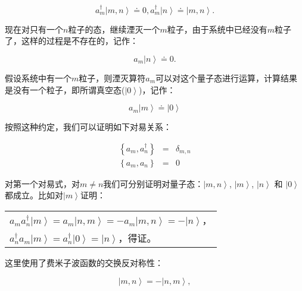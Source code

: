 \begin{equation*}
a_m^\dag  \left| {m,n} \right\rangle  \doteq 0, a_m^\dag  \left| n
\right\rangle \doteq \left| {m,n} \right\rangle .
\end{equation*}


现在对只有一个$n$粒子的态，继续湮灭一个$m$粒子，由于系统中已经没有$m$粒子了，这样的过程是不存在的，记作：

\begin{equation*}
a_m \left| n \right\rangle \doteq 0 .
\end{equation*}


假设系统中有一个$m$粒子，则湮灭算符$a_m$可以对这个量子态进行运算，计算结果是没有一个粒子，即所谓真空态($\left|
0 \right\rangle$)，记作：

\begin{equation}\label{eq 3}
a_m \left| m \right\rangle \doteq \left| 0 \right\rangle
\end{equation}


按照这种约定，我们可以证明如下对易关系：

\begin{eqnarray}
  \left\{ {a_m ,a_n^\dag  } \right\} &=& \delta _{m,n} \\
  \left\{
{a_m,a_n } \right\} &=& 0
\end{eqnarray}



对第一个对易式，对$m \ne n$我们可分别证明对量子态：$\left| {m,n}
\right\rangle$, $\left| m \right\rangle$, $\left| n \right\rangle$
和 $\left| 0 \right\rangle$都成立。比如对$\left| m
\right\rangle$证明：


\begin{center}
\begin{tabular}{|l|}
  \hline
  $a_m a_n^\dag  \left| m \right\rangle  = a_m \left| {n,m}
\right\rangle  =  - a_m \left| {m,n} \right\rangle  =  - \left| n
\right\rangle $，\\
$a_n^\dag  a_m \left| m \right\rangle  = a_n^\dag
\left| 0 \right\rangle  = \left| n \right\rangle $，得证。 \\
  \hline
\end{tabular}
\end{center}


这里使用了费米子波函数的交换反对称性：

\begin{equation}
\left| {m,n} \right\rangle  = - \left| {n,m} \right\rangle ,
\end{equation}


